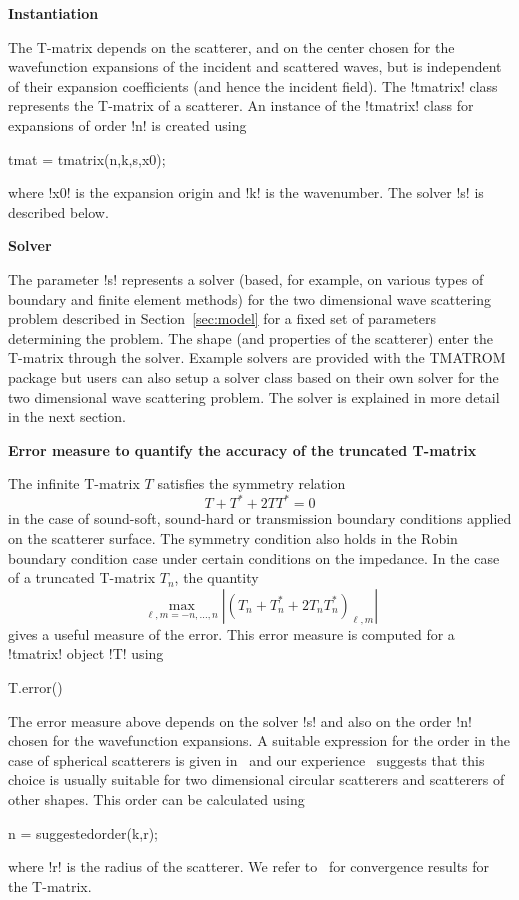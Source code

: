 \documentclass[12pt,letterpaper,final]{article}
\newcommand{\techheading}[1]{%
    \par\vspace{-0.3\parskip}\noindent\hspace{-1cm}\textbf{#1}%
    \par\vspace{-0.5\parskip}\noindent\nopagebreak\ignorespaces}
\begin{document}
\techheading{Instantiation}
The T-matrix 
depends on the scatterer, and on the
center chosen for the wavefunction expansions of the incident 
and scattered waves, but
is independent of their expansion coefficients (and hence the incident field).
The !tmatrix! class represents the T-matrix of a scatterer.
An instance of the !tmatrix! class 
for expansions of order !n! 
is created using
\begin{matlab}
tmat = tmatrix(n,k,s,x0);
\end{matlab}
where !x0! is the expansion origin and !k! is the wavenumber.
The solver !s! is described below.

\techheading{Solver}
The parameter !s! represents a solver (based, for example, on 
various types of boundary and finite element methods)  for  the two dimensional wave
scattering problem described in Section~\ref{sec:model} for a fixed set
of parameters determining the problem. 
The shape (and properties of the scatterer) enter the T-matrix 
through the solver.
Example solvers are provided with the TMATROM package but users can also
setup a solver class based on their own solver for the two dimensional
wave scattering problem.
The solver is explained in more detail in the next section.

\techheading{Error measure to quantify the accuracy of the truncated T-matrix}
The infinite T-matrix $T$ 
satisfies the symmetry relation~\cite[Theorem~1]{gh:tmat2d}
\begin{displaymath}
T + T^* + 2TT^* = 0
\end{displaymath}
in the case of sound-soft, sound-hard or transmission boundary conditions
applied on the scatterer surface.
The symmetry condition also holds in the Robin boundary condition case
under certain conditions on the impedance.
In the case of a truncated T-matrix $T_n$, the quantity
\begin{displaymath}
\max_{\ell,m = -n,\dots,n} | (T_n + T_n^* + 2 T_n T_n^*)_{\ell,m} |
\end{displaymath}
gives a useful measure of the error.
This error measure is computed for a !tmatrix! object !T! using
\begin{matlab}
T.error()
\end{matlab}

The error measure above depends on the solver !s! and also on the order !n! chosen for 
the wavefunction expansions. 
A suitable expression for the order in the case of spherical scatterers is 
given in~\cite{wiscombe:mie}   
and our experience~\cite{gh:ctac-tmatrix, ghh:tmatrix}  suggests that this choice is usually 
suitable for two dimensional circular scatterers and scatterers of other shapes.
This order can be calculated using
\begin{matlab}
n = suggestedorder(k,r);
\end{matlab}
where !r! is the radius of the scatterer.
We refer to~\cite{ghh:tmatrix} for convergence results for the T-matrix.
\end{document}
